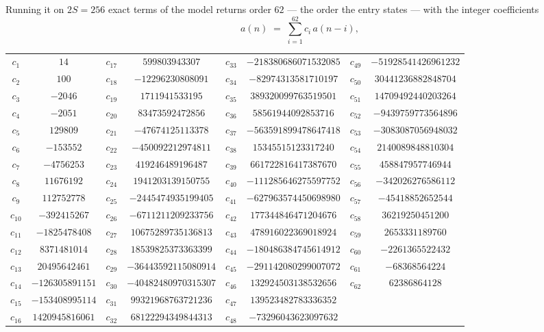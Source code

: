 \documentclass[11pt,a4paper]{article}
\theoremstyle{plain}
\theoremstyle{definition}
\begin{document}
Running it on $2S=256$ exact terms of the model returns order $62$ --- the order the
entry states --- with the integer coefficients
\[
a(n)\;=\;\sum_{i=1}^{62}c_i\,a(n-i),
\]
\begin{center}\small
\begin{tabular}{cccccccc}
$c_{1}$ & $14$ & $c_{17}$ & $599803943307$ & $c_{33}$ & $-218380686071532085$ & $c_{49}$ & $-51928541426961232$ \\
$c_{2}$ & $100$ & $c_{18}$ & $-12296230808091$ & $c_{34}$ & $-82974313581710197$ & $c_{50}$ & $30441236882848704$ \\
$c_{3}$ & $-2046$ & $c_{19}$ & $1711941533195$ & $c_{35}$ & $389320099763519501$ & $c_{51}$ & $14709492440203264$ \\
$c_{4}$ & $-2051$ & $c_{20}$ & $83473592472856$ & $c_{36}$ & $58561944092853716$ & $c_{52}$ & $-9439759773564896$ \\
$c_{5}$ & $129809$ & $c_{21}$ & $-47674125113378$ & $c_{37}$ & $-563591899478647418$ & $c_{53}$ & $-3083087056948032$ \\
$c_{6}$ & $-153552$ & $c_{22}$ & $-450092212974811$ & $c_{38}$ & $15345515123317240$ & $c_{54}$ & $2140089848810304$ \\
$c_{7}$ & $-4756253$ & $c_{23}$ & $419246489196487$ & $c_{39}$ & $661722816417387670$ & $c_{55}$ & $458847957746944$ \\
$c_{8}$ & $11676192$ & $c_{24}$ & $1941203139150755$ & $c_{40}$ & $-111285646275597752$ & $c_{56}$ & $-342026276586112$ \\
$c_{9}$ & $112752778$ & $c_{25}$ & $-2445474935199405$ & $c_{41}$ & $-627963574450698980$ & $c_{57}$ & $-45418852652544$ \\
$c_{10}$ & $-392415267$ & $c_{26}$ & $-6711211209233756$ & $c_{42}$ & $177344846471204676$ & $c_{58}$ & $36219250451200$ \\
$c_{11}$ & $-1825478408$ & $c_{27}$ & $10675289735136813$ & $c_{43}$ & $478916022369018924$ & $c_{59}$ & $2653331189760$ \\
$c_{12}$ & $8371481014$ & $c_{28}$ & $18539825373363399$ & $c_{44}$ & $-180486384745614912$ & $c_{60}$ & $-2261365522432$ \\
$c_{13}$ & $20495642461$ & $c_{29}$ & $-36443592115080914$ & $c_{45}$ & $-291142080299007072$ & $c_{61}$ & $-68368564224$ \\
$c_{14}$ & $-126305891151$ & $c_{30}$ & $-40482480970315307$ & $c_{46}$ & $132924503138532656$ & $c_{62}$ & $62386864128$ \\
$c_{15}$ & $-153408995114$ & $c_{31}$ & $99321968763721236$ & $c_{47}$ & $139523482783336352$ &  &  \\
$c_{16}$ & $1420945816061$ & $c_{32}$ & $68122294349844313$ & $c_{48}$ & $-73296043623097632$ &  &  \\
\end{tabular}
\end{center}
\end{document}
